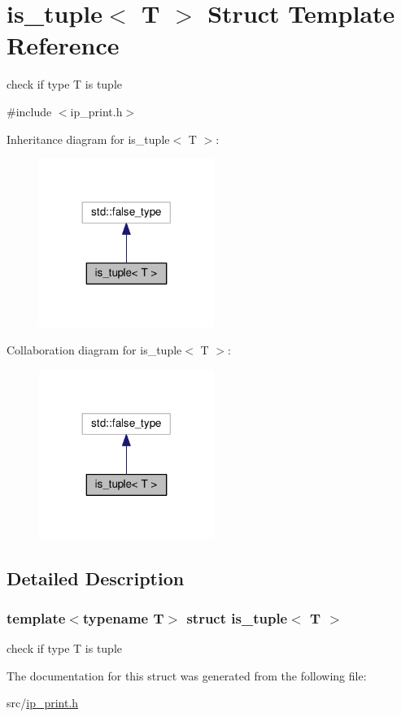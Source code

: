 \hypertarget{structis__tuple}{}\section{is\+\_\+tuple$<$ T $>$ Struct Template Reference}
\label{structis__tuple}


check if type T is tuple  




{\ttfamily \#include $<$ip\+\_\+print.\+h$>$}



Inheritance diagram for is\+\_\+tuple$<$ T $>$\+:
\nopagebreak
\begin{figure}[H]
\begin{center}
\leavevmode
\includegraphics[width=161pt]{structis__tuple__inherit__graph}
\end{center}
\end{figure}


Collaboration diagram for is\+\_\+tuple$<$ T $>$\+:
\nopagebreak
\begin{figure}[H]
\begin{center}
\leavevmode
\includegraphics[width=161pt]{structis__tuple__coll__graph}
\end{center}
\end{figure}


\subsection{Detailed Description}
\subsubsection*{template$<$typename T$>$\newline
struct is\+\_\+tuple$<$ T $>$}

check if type T is tuple 

The documentation for this struct was generated from the following file\+:\begin{DoxyCompactItemize}
\item 
src/\hyperlink{ip__print_8h}{ip\+\_\+print.\+h}\end{DoxyCompactItemize}
